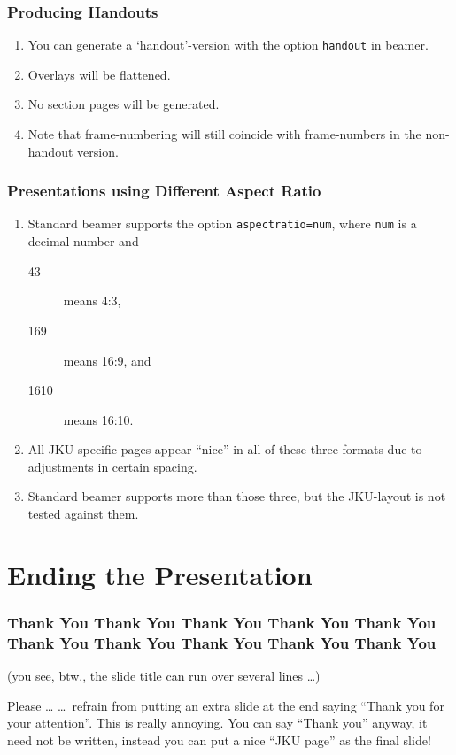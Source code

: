 \documentclass[aspectratio=169]{beamer}
\begin{document}
\begin{frame}[label=handout]
\frametitle{Producing Handouts}
  
 \begin{enumerate}
  \item You can generate a `handout'-version with the option \texttt{handout} in \alert{beamer}.
  \item Overlays will be flattened.
  \item No section pages will be generated.
  \item Note that frame-numbering will still coincide with frame-numbers in the non-handout version.
 \end{enumerate}
\end{frame}

 \begin{frame}[containsverbatim]
\frametitle{Presentations using Different Aspect Ratio}
  
 \begin{enumerate}
  \item Standard beamer supports the option \verb+aspectratio=num+, where \verb+num+ is a decimal number and
\begin{description}
 \item[43] means 4:3,
 \item[169] means 16:9, and
 \item[1610] means 16:10.
\end{description}
  \item All JKU-specific pages appear ``nice'' in all of these three formats due to adjustments in certain spacing.
  \item Standard beamer supports more than those three, but the JKU-layout is not tested against them.
 \end{enumerate}
\end{frame}

\section{Ending the Presentation}

\begin{frame}
\frametitle{Thank You Thank You Thank You Thank You Thank You Thank You Thank You Thank You Thank You Thank You}

(you see, btw., the slide title can run over several lines \ldots)

\begin{block}{Please \ldots}
  \ldots\ refrain from putting an extra slide at the end saying \alert{``Thank you for your attention''}. This is really annoying. You can say ``Thank you'' anyway, it need not be written, instead you can put a nice ``JKU page'' as the final slide! \cite{schultz,karol}
\end{block}

\end{frame}
\end{document}
